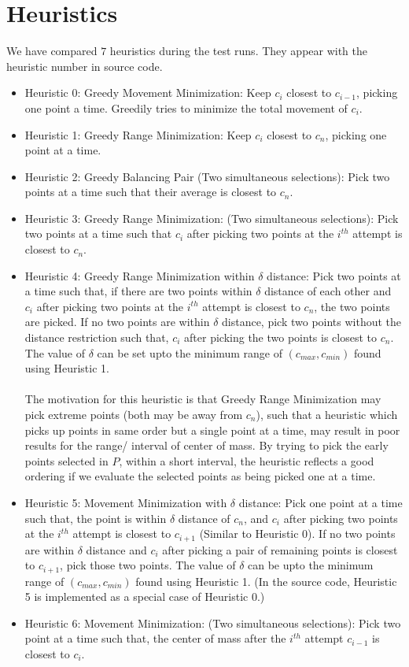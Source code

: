 \documentclass[11pt]{article} %
\begin{document}
\section{Heuristics}
We have compared $7$ heuristics during the test runs. They appear with the heuristic number in source code.
\begin{itemize}
	\item Heuristic 0: Greedy Movement Minimization: Keep $c_i$ closest to $c_{i-1}$, picking one point a time. Greedily tries to minimize the total
	movement of $c_i$.
	\item Heuristic 1: Greedy Range Minimization: Keep $c_i$ closest to $c_n$, picking one
	point at a time.
	\item Heuristic 2: Greedy Balancing Pair (Two simultaneous selections): Pick two points at a time such that their
	average is closest to $c_n$.
	\item Heuristic 3: Greedy Range Minimization: (Two simultaneous selections): Pick two points at a time such that $c_i$ after picking two points at the $i^{th}$ attempt is closest to $c_n$.
	\item Heuristic 4: Greedy Range Minimization within $\delta$ distance: Pick two points at a time such that, if there are two points within $\delta$ distance of each other and $c_i$ after picking two points at the $i^{th}$ attempt is closest to $c_n$, the two points are picked.
	If no two points are within $\delta$ distance, pick two points without the distance restriction such that, $c_i$ after picking the two points is closest to $c_n$. The value of $\delta$ can be set upto the minimum range of $\left( c_{max}, c_{min} \right)$ found using Heuristic 1.\\
	\\
	The motivation for this heuristic is that Greedy Range Minimization may pick extreme points (both may be away from
	$c_n$), such that a heuristic which picks up points in same order but a single point at a time, may result in poor
	results for the range/ interval of center of mass. By trying to pick the early points selected in $P$, within a short
	interval, the heuristic reflects a good ordering if we evaluate the selected points as being picked one at a time.

	\item Heuristic 5: Movement Minimization with $\delta$ distance: Pick one point at a time such that, the point is within $\delta$ distance of $c_n$, and $c_i$ after picking two points at the $i^{th}$ attempt is closest to $c_{i+1}$ (Similar to Heuristic 0). If no two points are within $\delta$ distance and $c_i$ after picking a pair of remaining points is closest to $c_{i+1}$, pick those two points.
	The value of $\delta$ can be upto the minimum range of $\left( c_{max}, c_{min} \right)$ found using Heuristic 1. (In the source code, Heuristic 5 is implemented as a special case of Heuristic 0.)
	\item Heuristic 6: Movement Minimization: (Two simultaneous selections): Pick two point at a time such that, the center of mass after the $i^{th}$ attempt $c_{i-1}$ is closest to $c_i$.
\end{itemize}
\end{document}
